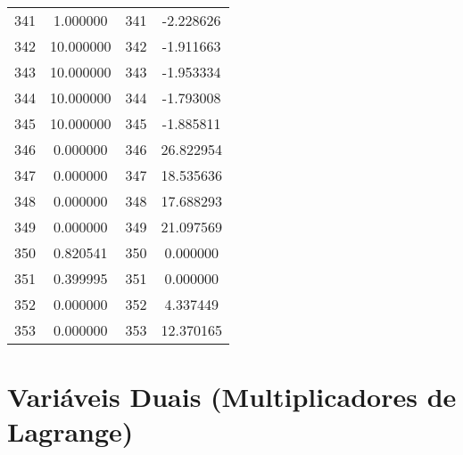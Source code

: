 \documentclass[12pt]{article}
\begin{document}
\begin{longtable}{@{}cccc@{}}
341 & 1.000000 & 341 & -2.228626 \\
342 & 10.000000 & 342 & -1.911663 \\
343 & 10.000000 & 343 & -1.953334 \\
344 & 10.000000 & 344 & -1.793008 \\
345 & 10.000000 & 345 & -1.885811 \\
346 & 0.000000 & 346 & 26.822954 \\
347 & 0.000000 & 347 & 18.535636 \\
348 & 0.000000 & 348 & 17.688293 \\
349 & 0.000000 & 349 & 21.097569 \\
350 & 0.820541 & 350 & 0.000000 \\
351 & 0.399995 & 351 & 0.000000 \\
352 & 0.000000 & 352 & 4.337449 \\
353 & 0.000000 & 353 & 12.370165 \\

\end{longtable}

\section{Variáveis Duais (Multiplicadores de Lagrange)}
\end{document}
